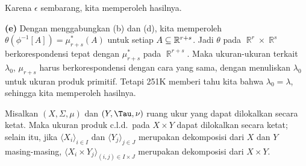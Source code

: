 {

\noindent Karena $\epsilon$ sembarang, kita memperoleh hasilnya.\ \Qed

\medskip

{\bf (e)} Dengan menggabungkan (b) dan (d), kita memperoleh
$\theta(\phi^{-1}[A])=\mu^*_{r+s}(A)$ untuk setiap $A\subseteq\Bbb
R^{r+s}$. Jadi $\theta$ pada $\BbbR^r\times\BbbR^s$ berkorespondensi
tepat dengan $\mu^*_{r+s}$ pada $\BbbR^{r+s}$. Maka ukuran-ukuran terkait
$\lambda_0$, $\mu_{r+s}$ harus berkorespondensi dengan cara yang sama,
dengan menuliskan $\lambda_0$ untuk ukuran produk primitif. Tetapi 251K memberi tahu
kita bahwa $\lambda_0=\lambda$, sehingga kita memperoleh hasilnya.
}%

 Misalkan $(X,\Sigma,\mu)$ dan $(Y,\Tau,\nu)$
ruang ukur yang dapat dilokalkan secara ketat. Maka ukuran produk c.l.d.\ pada
$X\times Y$ dapat dilokalkan secara ketat; selain itu, jika
$\langle X_i\rangle_{i\in I}$ dan $\langle Y_j\rangle_{j\in J}$ merupakan
dekomposisi dari $X$ dan $Y$ masing-masing,
$\langle X_i\times Y_j\rangle_{(i,j)\in I\times J}$ merupakan dekomposisi dari
$X\times Y$.

